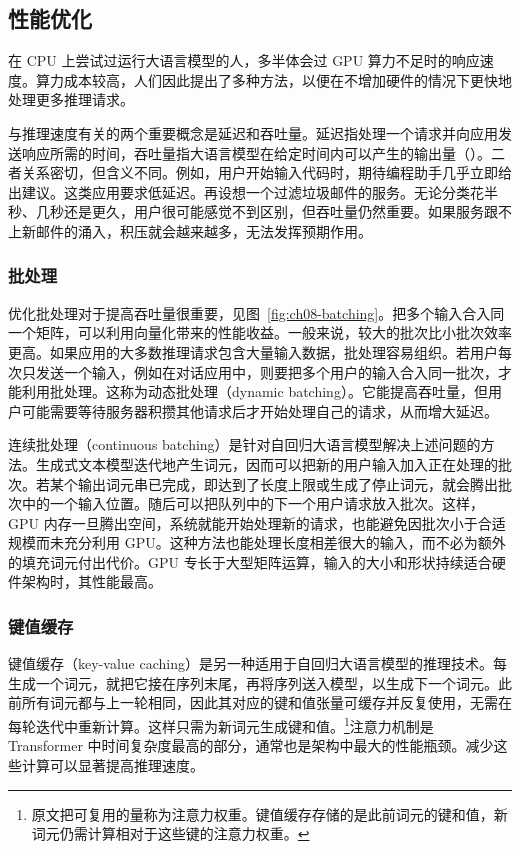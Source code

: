 \subsection{性能优化}
\label{sec:ch08-inference-performance}
在 CPU 上尝试过运行大语言模型的人，多半体会过 GPU 算力不足时的响应速度。算力成本较高，人们因此提出了多种方法，以便在不增加硬件的情况下更快地处理更多推理请求。

与推理速度有关的两个重要概念是延迟和吞吐量。延迟指处理一个请求并向应用发送响应所需的时间，吞吐量指大语言模型在给定时间内可以产生的输出量（）。二者关系密切，但含义不同。例如，用户开始输入代码时，期待编程助手几乎立即给出建议。这类应用要求低延迟。再设想一个过滤垃圾邮件的服务。无论分类花半秒、几秒还是更久，用户很可能感觉不到区别，但吞吐量仍然重要。如果服务跟不上新邮件的涌入，积压就会越来越多，无法发挥预期作用。

\subsubsection{批处理}
\label{sec:ch08-batching}
优化批处理对于提高吞吐量很重要，见图~\ref{fig:ch08-batching}。把多个输入合入同一个矩阵，可以利用向量化带来的性能收益。一般来说，较大的批次比小批次效率更高。如果应用的大多数推理请求包含大量输入数据，批处理容易组织。若用户每次只发送一个输入，例如在对话应用中，则要把多个用户的输入合入同一批次，才能利用批处理。这称为动态批处理（dynamic batching）。它能提高吞吐量，但用户可能需要等待服务器积攒其他请求后才开始处理自己的请求，从而增大延迟。

连续批处理（continuous batching）是针对自回归大语言模型解决上述问题的方法。生成式文本模型迭代地产生词元，因而可以把新的用户输入加入正在处理的批次。若某个输出词元串已完成，即达到了长度上限或生成了停止词元，就会腾出批次中的一个输入位置。随后可以把队列中的下一个用户请求放入批次。这样，GPU 内存一旦腾出空间，系统就能开始处理新的请求，也能避免因批次小于合适规模而未充分利用 GPU。这种方法也能处理长度相差很大的输入，而不必为额外的填充词元付出代价。GPU 专长于大型矩阵运算，输入的大小和形状持续适合硬件架构时，其性能最高。


\subsubsection{键值缓存}
键值缓存（key-value caching）是另一种适用于自回归大语言模型的推理技术。每生成一个词元，就把它接在序列末尾，再将序列送入模型，以生成下一个词元。此前所有词元都与上一轮相同，因此其对应的键和值张量可缓存并反复使用，无需在每轮迭代中重新计算。这样只需为新词元生成键和值。\footnote{原文把可复用的量称为注意力权重。键值缓存存储的是此前词元的键和值，新词元仍需计算相对于这些键的注意力权重。}注意力机制是 Transformer 中时间复杂度最高的部分，通常也是架构中最大的性能瓶颈。减少这些计算可以显著提高推理速度。

